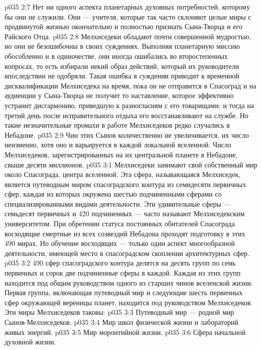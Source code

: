 \vs p035 2:7 Нет ни одного аспекта планетарных духовных потребностей, которому бы они не служили. Они --- учителя, которые так часто склоняют целые миры с продвинутой жизнью окончательно и полностью признать Сына\hyp{}Творца и его Райского Отца.
\vs p035 2:8 \pc Мелхиседеки обладают почти совершенной мудростью, но они не безошибочны в своих суждениях. Выполняя планетарную миссию обособленно и в одиночестве, они иногда ошибались во второстепенных вопросах, то есть избирали некий образ действий, который их руководители впоследствии не одобряли. Такая ошибка в суждении приводит к временной дисквалификации Мелхиседека на время, пока он не отправится в Спасоград и на аудиенции у Сына\hyp{}Творца не получит то наставление, которое эффективно устранит дисгармонию, приведшую к разногласиям с его товарищами; и тогда на третий день после исправительного отдыха его восстанавливают на службе. Но такие незначительные промахи в работе Мелхиседеков редко случались в Небадоне.
\vs p035 2:9 Чин этих Сынов количественно не увеличивается, их число неизменно, хотя оно и варьируется в каждой локальной вселенной. Число Мелхиседеков, зарегистрированных на их центральной планете в Небадоне, свыше десяти миллионов.
\vs p035 3:1 Мелхиседеки занимают свой собственный мир около Спасограда, центра вселенной. Эта сфера, называющаяся Мелхиседек, является путеводным миром спасоградского контура из семидесяти первичных сфер, каждая из которых окружена шестью подчиненными сферами со специализированными видами деятельности. Эти удивительные сферы --- семьдесят первичных и 420 подчиненных --- часто называют Мелхиседекским университетом. При обретении статуса постоянных обитателей Спасограда восходящие смертные из всех созвездий Небадона проходят подготовку в этих 490 мирах. Но обучение восходящих --- только один аспект многообразной деятельности, имеющей место в спасоградском скоплении архитектурных сфер.
\vs p035 3:2 490 сфер спасоградского контура делятся на десять групп по семь первичных и сорок две подчиненные сферы в каждой. Каждая из этих групп находится под общим руководством одного из старших чинов вселенской жизни. Первая группа, включающая путеводный мир и следующие шесть первичных сфер окружающей вереницы планет, находится под руководством Мелхиседеков. Эти миры Мелхиседеков таковы:
\vs p035 3:3 \bibnobreakspace Путеводный мир --- родной мир Сынов\hyp{}Мелхиседеков.
\vs p035 3:4 \bibnobreakspace Мир школ физической жизни и лабораторий живых энергий.
\vs p035 3:5 \bibnobreakspace Мир моронтийной жизни.
\vs p035 3:6 \bibnobreakspace Сфера начальной духовной жизни.
